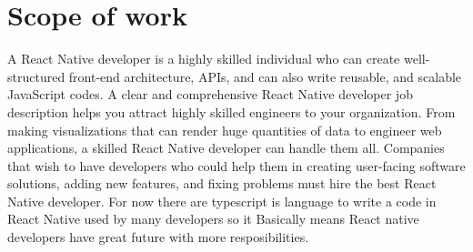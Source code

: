 \documentclass[12pt,a4paper]{report}
\begin{document}
\section{Scope of work}
\hspace{0.5cm} A React Native developer is a highly skilled individual who can create well-structured front-end architecture, APIs, and can also write reusable, and scalable JavaScript codes. A clear and comprehensive React Native developer job description helps you attract highly skilled engineers to your organization. From making visualizations that can render huge quantities of data to engineer web applications, a skilled React Native developer can handle them all. Companies that wish to have developers who could help them in creating user-facing software solutions, adding new features, and fixing problems must hire the best React Native developer. For now there are typescript is language to write a code in React Native used by many developers so it Basically means React native developers have great future with more resposibilities.
\end{document}
